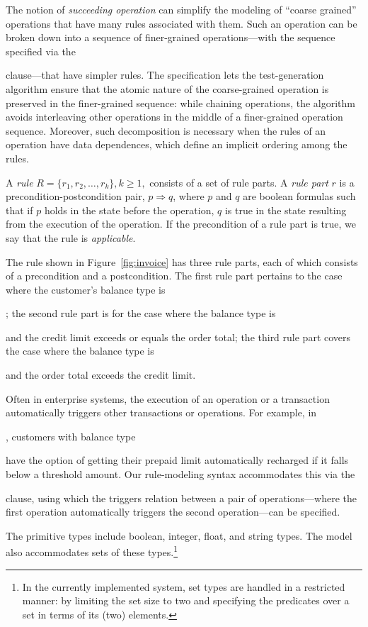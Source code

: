 The notion of \textit{succeeding operation} can simplify the modeling of
``coarse grained'' operations that have many rules associated with them. Such an
operation can be broken down into a sequence of finer-grained operations---with
the sequence specified via the \subject{next} clause---that have simpler
rules. The specification lets the test-generation algorithm ensure that the
atomic nature of the coarse-grained operation is preserved in the finer-grained
sequence: while chaining operations, the algorithm avoids interleaving other
operations in the middle of a finer-grained operation sequence.  Moreover, such
decomposition is necessary when the rules of an operation have data dependences,
which define an implicit ordering among the rules. %

A \textit{rule} $R = \{r_1, r_2, \ldots, r_k\}, k \geq 1,$ consists of a set of
rule parts. A \textit{rule part} $r$ is a precondition-postcondition pair, $p
\Longrightarrow q$, where $p$ and $q$ are boolean formulas such that if $p$
holds in the state before the operation, $q$ is true in the state resulting from
the execution of the operation. If the precondition of a rule part is true, we
say that the rule is \textit{applicable}.

The rule shown in Figure~\ref{fig:invoice} has three rule parts, each of which
consists of a precondition and a postcondition. The first rule part pertains to
the case where the customer's balance type is \subject{None}; the second rule
part is for the case where the balance type is \subject{Credit} and the credit
limit exceeds or equals the order total; the third rule part covers the case
where the balance type is \subject{Credit} and the order total exceeds the
credit limit.

Often in enterprise systems, the execution of an operation or a transaction
automatically triggers other transactions or operations. For example, in
\subject{jBilling}, customers with balance type \subject{Prepaid} have the
option of getting their prepaid limit automatically recharged if it falls below
a threshold amount. Our rule-modeling syntax accommodates this via the
\subject{Triggers} clause, using which the triggers relation between a pair of
operations---where the first operation automatically triggers the second
operation---can be specified.

The primitive types include boolean, integer, float, and string types. The model
also accommodates sets of these types.\footnote{\small In the currently
  implemented system, set types are handled in a restricted manner: by limiting
  the set size to two and specifying the predicates over a set in terms of its
  (two) elements.}

